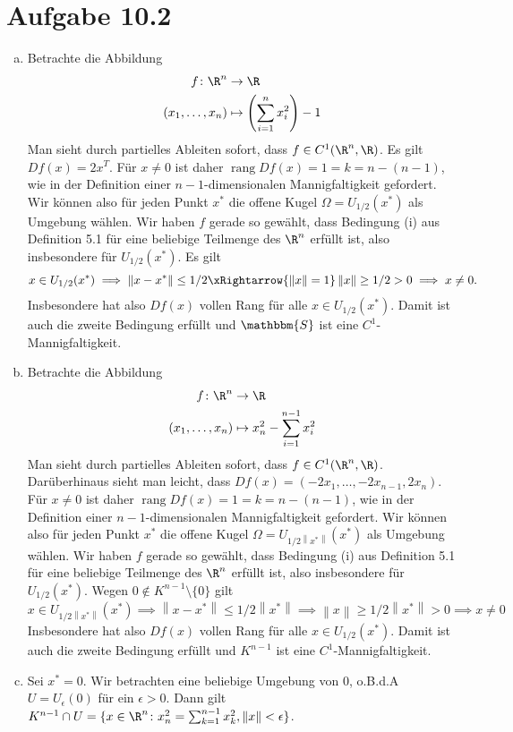 \documentclass{article}
\newcommand{\norm}[1]{\left\lVert #1 \right\rVert}
\begin{document}
    \section*{Aufgabe 10.2}
    \begin{enumerate}[(a)]
        \item Betrachte die Abbildung
        \begin{align*}
            f\colon \R^n &\to \R\\
            (x_1, \dots, x_n) &\mapsto \left(\sum_{i = 1}^{n} x_i^2\right) - 1
        \end{align*}
        Man sieht durch partielles Ableiten sofort, dass $f \in C^1(\R^n, \R)$.
        Es gilt $Df(x) = 2x^T$. Für $x \neq 0$ ist daher $\operatorname{rang} Df(x) = 1 = k = n- (n-1)$, 
        wie in der Definition einer $n-1$-dimensionalen Mannigfaltigkeit gefordert.
        Wir können also für jeden Punkt $x^*$ die offene Kugel $\Omega = U_{1/2}(x^*)$ als Umgebung wählen.
        Wir haben $f$ gerade so gewählt, dass Bedingung (i) aus Definition 5.1 für eine beliebige Teilmenge des $\R^n$ erfüllt ist,
        also insbesondere für $U_{1/2}(x^*)$.
        Es gilt
        \[ 
            x \in U_{1/2}(x^*) \implies \norm{x - x^*} \leq 1/2 \xRightarrow{\norm{x} = 1} \norm{x} \geq 1/2 > 0 \implies x \neq 0.
        \]
        Insbesondere hat also $Df(x)$ vollen Rang für alle $x\in U_{1/2}(x^*)$.
        Damit ist auch die zweite Bedingung erfüllt und $\mathbbm{S}$ ist eine $C^1$-Mannigfaltigkeit.
        \item Betrachte die Abbildung
        \begin{align*}
            f\colon \R^n &\to \R\\
            (x_1, \dots, x_n) &\mapsto x_n^2 - \sum_{i = 1}^{n-1} x_i^2
        \end{align*}
        Man sieht durch partielles Ableiten sofort, dass $f \in C^1(\R^n, \R)$.
        Darüberhinaus sieht man leicht, dass $Df(x) = (-2x_1, \dots, -2x_{n-1}, 2x_n)$. Für $x \neq 0$ ist daher $\operatorname{rang} Df(x) = 1 = k = n- (n-1)$, 
        wie in der Definition einer $n-1$-dimensionalen Mannigfaltigkeit gefordert.
        Wir können also für jeden Punkt $x^*$ die offene Kugel $\Omega = U_{1/2\norm{x^*}}(x^*)$ als Umgebung wählen.
        Wir haben $f$ gerade so gewählt, dass Bedingung (i) aus Definition 5.1 für eine beliebige Teilmenge des $\R^n$ erfüllt ist,
        also insbesondere für $U_{1/2}(x^*)$.
        Wegen $0\notin K^{n-1}\setminus\{0\}$ gilt
        \[ 
            x \in U_{1/2\norm{x^*}}(x^*) \implies \norm{x - x^*} \leq 1/2\norm{x^*} \implies \norm{x} \geq 1/2\norm{x^*} > 0 \implies x \neq 0
        \]
        Insbesondere hat also $Df(x)$ vollen Rang für alle $x\in U_{1/2}(x^*)$.
        Damit ist auch die zweite Bedingung erfüllt und $K^{n-1}$ ist eine $C^1$-Mannigfaltigkeit.
        \item Sei $x^* = 0$. Wir betrachten eine beliebige Umgebung von $0$, o.B.d.A $U = U_{\epsilon}(0)$ für ein $\epsilon >0$.
        Dann gilt $K^{n-1} \cap U = \{x \in \R^n\colon x_n^2 = \sum_{k = 1}^{n-1} x_k^2, \norm{x} < \epsilon\}$.
    \end{enumerate}
\end{document}
